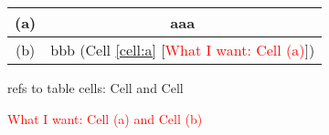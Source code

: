 \documentclass{report}
\begin{document}
\begin{table}[t]
  \centering
  \label{table:label-in-cell}
  \begin{tabular}{|c|c|}
  \hline
  (a) \label{cell:a} & aaa \\ \hline
  (b) \label{cell:b} & bbb (Cell \ref{cell:a} [\textcolor{red}{What I want: Cell (a)}]) \\ \hline
  \end{tabular}
\end{table}

  refs to table cells: Cell \label{cell:a} and Cell \label{cell:b}

  \textcolor{red}{What I want: Cell (a) and Cell (b)}
\end{document}
